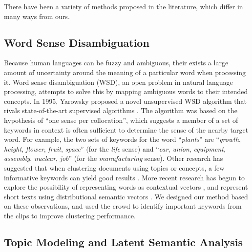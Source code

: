 
There have been a variety of methods proposed in the literature, which differ
in many ways from ours.

\subsection{Word Sense Disambiguation}

Because human languages can be fuzzy and ambiguous, their exists a large amount 
of uncertainty around the meaning of a particular word when processing it. Word sense 
disambiguation (WSD), an open problem in natural language processing, attempts to solve
this by mapping ambiguous words to their intended concepts.  In 1995, Yarowsky proposed a novel
unsupervised WSD algorithm that rivals state-of-the-art supervised algorithms
\cite{yarowsky1995unsupervised}. The algorithm was based on the hypothesis of
``one sense per collocation'', which suggests a member of a set of keywords in
context is often sufficient to determine the sense of the nearby target word.
For example, the two sets of keywords for the word ``\emph{plants}'' are
``\emph{growth}, \emph{height}, \emph{flower}, \emph{fruit}, \emph{space}''
(for the \emph{life} sense) and ``\emph{car}, \emph{union}, \emph{equipment},
\emph{assembly}, \emph{nuclear}, \emph{job}'' (for the \emph{manufacturing}
sense).  Other research has suggested that when clustering documents using
topics or concepts, %
a few informative keywords can yield good results
\cite{huang2006text}. More recent research has begun to explore the
possibility of representing words as contextual vectors
\cite{mikolov2013linguistic}, and represent short texts using distributional
semantic vectors \cite{socher2012semantic,socher2013recursive}. We designed our
method based on these observations, and used the crowd to identify important
keywords from the clips to improve clustering performance.


\subsection{Topic Modeling and Latent Semantic Analysis}



